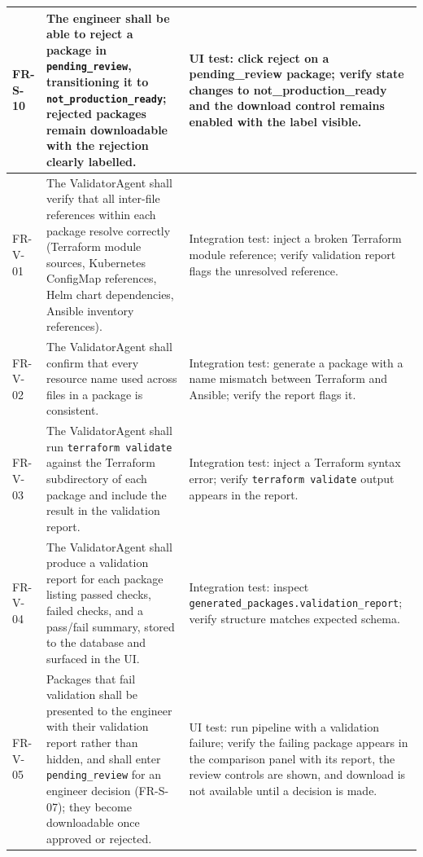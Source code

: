 \begin{longtable}{@{}p{}p{}p{}@{}}
FR-S-10 & The engineer shall be able to reject a package in
  \texttt{pending\_review}, transitioning it to
  \texttt{not\_production\_ready}; rejected packages remain downloadable
  with the rejection clearly labelled. &
  UI test: click reject on a pending\_review package; verify state
  changes to not\_production\_ready and the download control remains
  enabled with the label visible. \\

\midrule

FR-V-01 & The ValidatorAgent shall verify that all inter-file references
  within each package resolve correctly (Terraform module sources,
  Kubernetes ConfigMap references, Helm chart dependencies, Ansible
  inventory references). &
  Integration test: inject a broken Terraform module reference; verify
  validation report flags the unresolved reference. \\

FR-V-02 & The ValidatorAgent shall confirm that every resource name used
  across files in a package is consistent. &
  Integration test: generate a package with a name mismatch between
  Terraform and Ansible; verify the report flags it. \\

FR-V-03 & The ValidatorAgent shall run \texttt{terraform validate} against
  the Terraform subdirectory of each package and include the result in
  the validation report. &
  Integration test: inject a Terraform syntax error; verify
  \texttt{terraform validate} output appears in the report. \\

FR-V-04 & The ValidatorAgent shall produce a validation report for each
  package listing passed checks, failed checks, and a pass/fail summary,
  stored to the database and surfaced in the UI. &
  Integration test: inspect \texttt{generated\_packages.validation\_report};
  verify structure matches expected schema. \\

FR-V-05 & Packages that fail validation shall be presented to the engineer
  with their validation report rather than hidden, and shall enter
  \texttt{pending\_review} for an engineer decision (FR-S-07); they become
  downloadable once approved or rejected. &
  UI test: run pipeline with a validation failure; verify the failing
  package appears in the comparison panel with its report, the review
  controls are shown, and download is not available until a decision is
  made. \\


\end{longtable}
